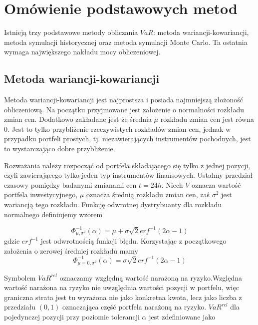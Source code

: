 \documentclass[12pt,titlepage]{article}
\numberwithin{equation}{section}
\begin{document}
\section{Omówienie podstawowych metod}
Istnieją trzy podstawowe metody obliczania $VaR$: metoda wariancji-kowariancji, metoda symulacji historycznej oraz metoda symulacji Monte Carlo. Ta ostatnia wymaga największego nakładu mocy obliczeniowej.



\subsection{Metoda wariancji-kowariancji}


Metoda wariancji-kowariancji jest najprostsza i posiada najmniejszą złożoność obliczeniową. Na początku przyjmowane jest założenie o normalności rozkładu zmian cen. Dodatkowo zakładane jest że średnia $\mu$ rozkładu zmian cen jest równa 0. Jest to tylko przybliżenie rzeczywistych rozkładów zmian cen, jednak w przypadku portfeli prostych, tj. niezawierających instrumentów pochodnych, jest to wystarczająco dobre przybliżenie. 

Rozważania należy rozpocząć od portfela składającego się tylko z jednej pozycji, czyli zawierającego tylko jeden typ instrumentów finansowych. Ustalmy przedział czasowy pomiędzy badanymi zmianami cen $t=24h$. Niech $V$ oznacza wartość portfela inwestycyjnego, $\mu$ oznacza średnią rozkładu zmian cen, zaś $\sigma^{2}$ jest wariancją tego rozkładu. Funkcję odwrotnej dystrybuanty dla rozkładu normalnego definiujemy wzorem 




\begin{equation} 
\Phi_{\mu,\sigma^{2}}^{-1}(\alpha)=\mu+\sigma \sqrt{2} erf^{-1}(2\alpha-1)
\end{equation} 
gdzie $erf^{-1}$ jest odwrotnością funkcji błędu. Korzystając z początkowego założenia o zerowej średniej rozkładu mamy
$$\Phi_{\mu=0,\sigma^{2}}^{-1}(\alpha)=\sigma \sqrt{2} erf^{-1}(2\alpha-1)$$



Symbolem $VaR^{rel}$ oznaczamy względną wartość narażoną na ryzyko.Względna wartość narażona na ryzyko nie uwzględnia wartości pozycji w portfelu, więc graniczna strata jest tu wyrażona nie jako konkretna kwota, lecz jako liczba z przedziału $(0,1)$ oznaczająca część portfela narażoną na ryzyko. $VaR^{rel}$ dla pojedynczej pozycji przy poziomie tolerancji $\alpha$ jest zdefiniowane jako
\end{document}
